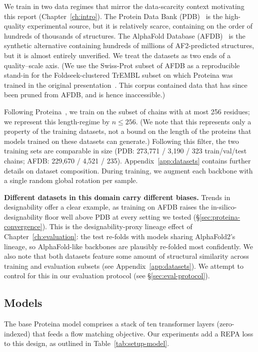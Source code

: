 \documentclass[12pt,a4paper,twoside]{report}
\begin{document}
We train in two data regimes that mirror the data-scarcity context motivating this report (Chapter~\ref{ch:intro}). The Protein Data Bank (PDB)~\cite{PDB} is the high-quality experimental source, but it is relatively scarce, containing on the order of hundreds of thousands of structures. The AlphaFold Database (AFDB)~\cite{AFDB} is the synthetic alternative containing hundreds of millions of AF2-predicted structures, but it is almost entirely unverified. We treat the datasets as two ends of a quality--scale axis. (We use the Swiss-Prot subset of AFDB as a reproducible stand-in for the Foldseek-clustered TrEMBL subset on which Proteina was trained in the original presentation~\cite{Proteina}. This corpus contained data that has since been pruned from AFDB, and is hence inaccessible.)

Following Proteina~\cite{Proteina}, we train on the subset of chains with at most 256 residues; we represent this length-regime by $n{\le}256$. (We note that this represents only a property of the training datasets, not a bound on the length of the proteins that models trained on these datasets can generate.) Following this filter, the two training sets are comparable in size (PDB: 273{,}771 / 3{,}190 / 323 train/val/test chains; AFDB: 229{,}670 / 4{,}521 / 235). Appendix~\ref{app:datasets} contains further details on dataset composition. During training, we augment each backbone with a single random global rotation per sample.

\textbf{Different datasets in this domain carry different biases.} Trends in designability offer a clear example, as training on AFDB raises the in-silico-designability floor well above PDB at every setting we tested (\S\ref{sec:proteina-convergence}). This is the designability-proxy lineage effect of Chapter~\ref{ch:evaluation}: the test re-folds with models sharing AlphaFold2's lineage, so AlphaFold-like backbones are plausibly re-folded most confidently. We also note that both datasets feature some amount of structural similarity across training and evaluation subsets (see Appendix~\ref{app:datasets}). We attempt to control for this in our evaluation protocol (see \S\ref{sec:eval-protocol}).

\subsection{Models}

The base Proteina model comprises a stack of ten transformer layers (zero-indexed) that feeds a flow matching objective. Our experiments add a REPA loss to this design, as outlined in Table~\ref{tab:setup-model}.
\end{document}
